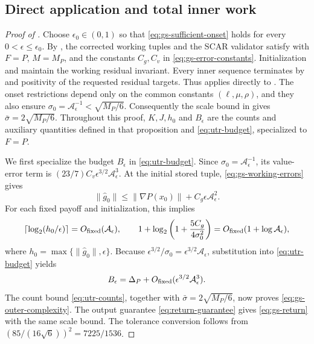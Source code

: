 \documentclass{article}
\begin{document}
\subsection{Direct application and total inner work}

\begin{proof}[Proof of ]
Choose $\epsilon_0\in(0,1)$ so that
\eqref{eq:gs-sufficient-onset} holds for every
$0<\epsilon\le\epsilon_0$.  By , the
corrected working tuples and the SCAR validator satisfy
 with $F=P$, $M=M_P$, and the constants
$C_g,C_v$ in \eqref{eq:gs-error-constants}.  Initialization and
 maintain the working residual invariant.
Every inner sequence terminates by 
and positivity of the requested residual targets.  Thus
 applies directly to
.  The onset restrictions depend only
on the common constants $(\ell,\mu,\rho)$, and they also ensure
$\sigma_0=\mathcal A_\epsilon^{-1}<\sqrt{M_P/6}$.  Consequently the
scale bound in  gives
$\bar\sigma=2\sqrt{M_P/6}$.  Throughout this proof, $K,J,h_0$ and
$B_\epsilon$ are the counts and auxiliary quantities defined in that
proposition and \eqref{eq:utr-budget}, specialized to $F=P$.

We first specialize the budget $B_\epsilon$ in
\eqref{eq:utr-budget}.  Since $\sigma_0=\mathcal A_\epsilon^{-1}$,
its value-error term is
$(23/7)C_v\epsilon^{3/2}\mathcal A_\epsilon^3$.  At the initial stored
tuple, \eqref{eq:gs-working-errors} gives
\[
 \|\widehat g_0\|
 \le\|\nabla P(x_0)\|+C_g\epsilon\mathcal A_\epsilon^2.
\]
For each fixed payoff and initialization, this implies
\[
 \left\lceil\log_2(h_0/\epsilon)\right\rceil
 =O_{\rm fixed}(\mathcal A_\epsilon),\qquad
 1+\log_2\left(1+\frac{5C_g}{4\sigma_0^2}\right)
 =O_{\rm fixed}(1+\log\mathcal A_\epsilon),
\]
where $h_0=\max\{\|\widehat g_0\|,\epsilon\}$.
Because $\epsilon^{3/2}/\sigma_0
=\epsilon^{3/2}\mathcal A_\epsilon$, substitution into
\eqref{eq:utr-budget} yields
\begin{equation}\label{eq:gs-budget-asymptotic}
 B_\epsilon=\Delta_P+
 O_{\rm fixed}(\epsilon^{3/2}\mathcal A_\epsilon^3).
\end{equation}
The count bound \eqref{eq:utr-counts}, together with
$\bar\sigma=2\sqrt{M_P/6}$, now proves
\eqref{eq:gs-outer-complexity}.  The output guarantee
\eqref{eq:return-guarantee} gives \eqref{eq:gs-return} with the same
scale bound.  The tolerance conversion follows from
$(85/(16\sqrt6))^2=7225/1536$.


\end{proof}
\end{document}
